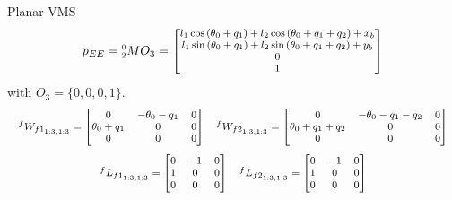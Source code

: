 \begin{frame}{Planar VMS}
    \begin{equation}
        \begin{footnotesize}
        p_{EE}=\prescript{0}{2}{M}O_3= \begin{bmatrix}
          l_1\cos{(\theta_0+q_1)}+l_2\cos{(\theta_0+q_1+q_2)}+x_b\\
          l_1\sin{(\theta_0+q_1)}+l_2\sin{(\theta_0+q_1+q_2)}+y_b\\0\\1
         \end{bmatrix}
        \end{footnotesize}
      \end{equation}
with $O_3=\{0,0,0,1\}$.
\begin{equation}
    \begin{footnotesize}
    \begin{array}{c}
      \prescript{f}{}{W_{{f1}_{1:3,1:3}}}=\begin{bmatrix}
        0&-\theta_0-q_1&0\\
        \theta_0+q_1&0&0\\
        0&0&0
      \end{bmatrix} \quad
      \prescript{f}{}{W_{{f2}_{1:3,1:3}}}=\begin{bmatrix}
        0&-\theta_0-q_1-q_2&0\\
        \theta_0+q_1+q_2&0&0\\
        0&0&0
      \end{bmatrix}
    \end{array}
    \end{footnotesize}
  \end{equation}
  \begin{equation}
  \begin{footnotesize}
    \begin{array}{c}
      \prescript{f}{}{L_{{f1}_{1:3,1:3}}}=\begin{bmatrix}
        0&-1&0\\
        1&0&0\\
        0&0&0
      \end{bmatrix} \quad
      \prescript{f}{}{L_{{f2}_{1:3,1:3}}}=\begin{bmatrix}
        0&-1&0\\
        1&0&0\\
        0&0&0
      \end{bmatrix}
    \end{array}
    \end{footnotesize}
  \end{equation}
\end{frame}

